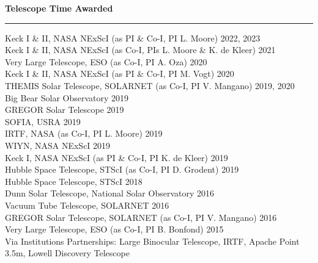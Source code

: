 \documentclass[12pt]{report}
\begin{document}
\noindent\bf{Telescope Time Awarded}\rm \hspace*{\fill} \\
\rule{\textwidth}{1pt}
Keck I \& II, NASA NExScI  (as PI \& Co-I, PI L. Moore) \hfill 2022, 2023\\
Keck I \& II, NASA NExScI (as Co-I, PIs L. Moore \& K. de Kleer) \hfill 2021\\
Very Large Telescope, ESO (as Co-I, PI A. Oza) \hfill 2020\\
Keck I \& II, NASA NExScI  (as PI \& Co-I, PI M. Vogt) \hfill 2020\\
THEMIS Solar Telescope, SOLARNET (as Co-I, PI V. Mangano) \hfill 2019, 2020\\
Big Bear Solar Observatory \hfill 2019\\
GREGOR Solar Telescope \hfill 2019\\
SOFIA, USRA \hfill 2019\\
IRTF, NASA (as Co-I, PI L. Moore) \hfill 2019\\
WIYN, NASA NExScI \hfill 2019\\
Keck I, NASA NExScI (as PI \& Co-I, PI K. de Kleer) \hfill 2019\\
Hubble Space Telescope, STScI (as Co-I, PI D. Grodent) \hfill 2019\\
Hubble Space Telescope, STScI \hfill 2018\\
Dunn Solar Telescope, National Solar Observatory \hfill 2016\\
Vacuum Tube Telescope, SOLARNET \hfill 2016\\
GREGOR Solar Telescope, SOLARNET (as Co-I, PI V. Mangano) \hfill 2016\\
Very Large Telescope, ESO (as Co-I, PI B. Bonfond) \hfill 2015\\
Via Institutions Partnerships: Large Binocular Telescope, IRTF, Apache Point 3.5m, Lowell Discovery Telescope\\
\end{document}
